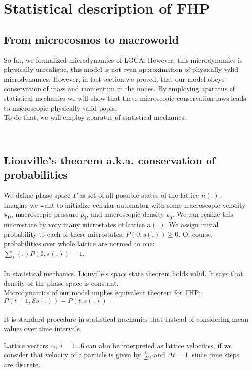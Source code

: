 \chapter{Statistical description of FHP}

\section{From microcosmos to macroworld}
So far, we formalized microdynamics of LGCA.
However, this microdynamics is physically unrealistic, this model is not even approximation of physically valid microdynamics.
However, in last section we proved, that our model obeys conservation of mass and momentum in the nodes.
By employing aparatus of statistical mechanics we will show that these microscopic conservation laws leads to macroscopic physically valid popis.
\\
To do that, we will employ aparatus of statistical mechanics.

\\
\section{Liouville's theorem a.k.a. conservation of probabilities}
We define phase space $\Gamma$ as set of all possible states of the lattice $n(.)$.\\
Imagine we want to initialize cellular automaton with some macroscopic velocity $\bm{v_0}$, macroscopic pressure $p_0$, and macroscopic density $\rho_0$.
We can realize this macrostate by very many microstates of lattice $n(.)$.
We assign initial probability to each of these microstates: $P(0,s(.)) \geq 0$. Of course, probabilities over whole lattice are normed to one:\\
$\sum_s(.) P(0,s(.)) = 1$.\\
\\
In statistical mechanics, Liouville's space state theorem holds valid.
It says that density of the phase space is constant.\\
Microdynamics of our model implies equivalent theorem for FHP:\\
$P(t+1, \mathcal{E} s(.)) = P(t, s(.))$\\
\\
It is standard procedure in statistical mechanics that instead of considering mean values over time intervals.



Lattice vectors $c_i,~i=1...6$ can also be interpreted as lattice velocities, if we consider that velocity of a particle is given by $\frac{c_i}{\Delta t}$, and $\Delta t = 1$, since time steps are discrete.
\\

